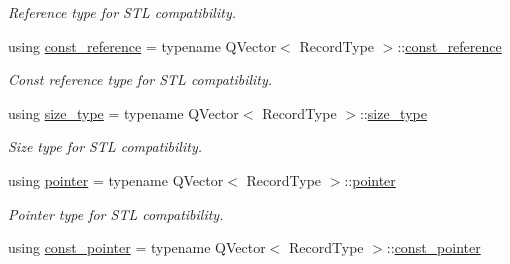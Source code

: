 \begin{DoxyCompactItemize}
\begin{DoxyCompactList}\small\item\em Reference type for S\+TL compatibility. \end{DoxyCompactList}\item 
using \hyperlink{class_mdt_1_1_plain_text_1_1_record_list_template_af264f3a2efda437fd0f58cbb15209b06}{const\+\_\+reference} = typename Q\+Vector$<$ Record\+Type $>$\+::\hyperlink{class_mdt_1_1_plain_text_1_1_record_list_template_af264f3a2efda437fd0f58cbb15209b06}{const\+\_\+reference}\hypertarget{class_mdt_1_1_plain_text_1_1_record_list_template_af264f3a2efda437fd0f58cbb15209b06}{}\label{class_mdt_1_1_plain_text_1_1_record_list_template_af264f3a2efda437fd0f58cbb15209b06}

\begin{DoxyCompactList}\small\item\em Const reference type for S\+TL compatibility. \end{DoxyCompactList}\item 
using \hyperlink{class_mdt_1_1_plain_text_1_1_record_list_template_ac5b714fe2e3a5361f343ee1b9a49546b}{size\+\_\+type} = typename Q\+Vector$<$ Record\+Type $>$\+::\hyperlink{class_mdt_1_1_plain_text_1_1_record_list_template_ac5b714fe2e3a5361f343ee1b9a49546b}{size\+\_\+type}\hypertarget{class_mdt_1_1_plain_text_1_1_record_list_template_ac5b714fe2e3a5361f343ee1b9a49546b}{}\label{class_mdt_1_1_plain_text_1_1_record_list_template_ac5b714fe2e3a5361f343ee1b9a49546b}

\begin{DoxyCompactList}\small\item\em Size type for S\+TL compatibility. \end{DoxyCompactList}\item 
using \hyperlink{class_mdt_1_1_plain_text_1_1_record_list_template_a95aa000e23da3c55a41e4d9e81ffedbb}{pointer} = typename Q\+Vector$<$ Record\+Type $>$\+::\hyperlink{class_mdt_1_1_plain_text_1_1_record_list_template_a95aa000e23da3c55a41e4d9e81ffedbb}{pointer}\hypertarget{class_mdt_1_1_plain_text_1_1_record_list_template_a95aa000e23da3c55a41e4d9e81ffedbb}{}\label{class_mdt_1_1_plain_text_1_1_record_list_template_a95aa000e23da3c55a41e4d9e81ffedbb}

\begin{DoxyCompactList}\small\item\em Pointer type for S\+TL compatibility. \end{DoxyCompactList}\item 
using \hyperlink{class_mdt_1_1_plain_text_1_1_record_list_template_a4f7a4908afbe8ec86a57c2a9922ceed3}{const\+\_\+pointer} = typename Q\+Vector$<$ Record\+Type $>$\+::\hyperlink{class_mdt_1_1_plain_text_1_1_record_list_template_a4f7a4908afbe8ec86a57c2a9922ceed3}{const\+\_\+pointer}\hypertarget{class_mdt_1_1_plain_text_1_1_record_list_template_a4f7a4908afbe8ec86a57c2a9922ceed3}{}\label{class_mdt_1_1_plain_text_1_1_record_list_template_a4f7a4908afbe8ec86a57c2a9922ceed3}


\end{DoxyCompactItemize}
